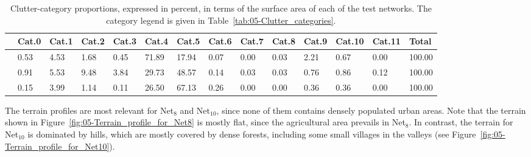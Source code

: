 \begin{table}
\centering

\caption{Clutter-category proportions, expressed in percent, in terms of the
surface area of each of the test networks. The category legend is
given in Table~\ref{tab:05-Clutter_categories}. \label{tab:05-Proportion_of_clutter_for_test_networks}}


{\scriptsize{}}%
\begin{tabular}{>{\centering}p{0.4cm}>{\centering}p{0.7cm}>{\centering}p{0.7cm}>{\centering}p{0.7cm}>{\centering}p{0.7cm}>{\centering}p{0.7cm}>{\centering}p{0.7cm}>{\centering}p{0.7cm}>{\centering}p{0.7cm}>{\centering}p{0.7cm}>{\centering}p{0.7cm}>{\centering}p{0.7cm}>{\centering}p{0.7cm}>{\centering}p{0.6cm}}
\cline{2-14} 
 & {\scriptsize{Cat.0}} & {\scriptsize{Cat.1}} & {\scriptsize{Cat.2}} & {\scriptsize{Cat.3}} & {\scriptsize{Cat.4}} & {\scriptsize{Cat.5}} & {\scriptsize{Cat.6}} & {\scriptsize{Cat.7}} & {\scriptsize{Cat.8}} & {\scriptsize{Cat.9}} & {\scriptsize{Cat.10}} & {\scriptsize{Cat.11}} & {\scriptsize{Total}}\tabularnewline
\hline 
{\scriptsize{Net$_{8}$ }} & {\scriptsize{0.53}} & {\scriptsize{4.53}} & {\scriptsize{1.68}} & {\scriptsize{0.45}} & {\scriptsize{71.89}} & {\scriptsize{17.94}} & {\scriptsize{0.07}} & {\scriptsize{0.00}} & {\scriptsize{0.03}} & {\scriptsize{2.21}} & {\scriptsize{0.67}} & {\scriptsize{0.00}} & {\scriptsize{100.00}}\tabularnewline
{\scriptsize{Net$_{9}$ }} & {\scriptsize{0.91}} & {\scriptsize{5.53}} & {\scriptsize{9.48}} & {\scriptsize{3.84}} & {\scriptsize{29.73}} & {\scriptsize{48.57}} & {\scriptsize{0.14}} & {\scriptsize{0.03}} & {\scriptsize{0.03}} & {\scriptsize{0.76}} & {\scriptsize{0.86}} & {\scriptsize{0.12}} & {\scriptsize{100.00}}\tabularnewline
{\scriptsize{Net$_{10}$ }} & {\scriptsize{0.15}} & {\scriptsize{3.99}} & {\scriptsize{1.14}} & {\scriptsize{0.11}} & {\scriptsize{26.50}} & {\scriptsize{67.13}} & {\scriptsize{0.26}} & {\scriptsize{0.00}} & {\scriptsize{0.00}} & {\scriptsize{0.36}} & {\scriptsize{0.36}} & {\scriptsize{0.00}} & {\scriptsize{100.00}}\tabularnewline
\hline 
\end{tabular}
\end{table}


The terrain profiles are most relevant for Net$_{8}$ and Net$_{10}$,
since none of them contains densely populated urban areas. Note that
the terrain shown in Figure~\ref{fig:05-Terrain_profile_for_Net8}
is mostly flat, since the agricultural area prevails in Net$_{8}$.
In contrast, the terrain for Net$_{10}$ is dominated by hills, which
are mostly covered by dense forests, including some small villages
in the valleys (see Figure~\ref{fig:05-Terrain_profile_for_Net10}).


